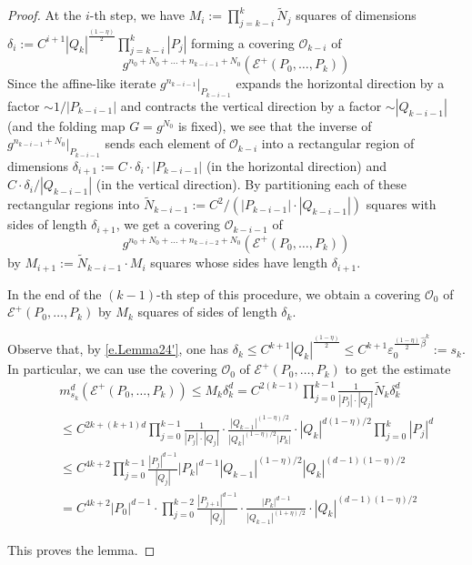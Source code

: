 \documentclass[12pt]{amsart}
\numberwithin{equation}{section}
\theoremstyle{definition}
\newcommand{\<}{{\langle}}
\renewcommand{\>}{{\rangle}}
\begin{document}
\begin{proof}
At the $i$-th step, we have $M_{i}:=\prod\limits_{j=k-i}^k \widetilde{N}_j$ squares of dimensions $\delta_i:=C^{i+1}|Q_k|^{\frac{(1-\eta)}{2}}\prod\limits_{j=k-i}^k |P_j|$ forming a covering 
$\mathcal{O}_{k-i}$ of 
$$g^{n_0+N_0+\dots+n_{k-i-1}+N_0}(\mathcal{E}^+(P_0,\dots,P_k))$$ 
Since the affine-like iterate $g^{n_{k-i-1}}|_{P_{k-i-1}}$ expands the horizontal direction by a factor $\sim 1/|P_{k-i-1}|$ and contracts the vertical direction by a factor $\sim |Q_{k-i-1}|$ (and the folding map $G=g^{N_0}$ is fixed), we see that the inverse of $g^{n_{k-i-1}+N_0}|_{P_{k-i-1}}$ sends each element of $\mathcal{O}_{k-i}$ into a rectangular region of dimensions $\delta_{i+1}:=C\cdot \delta_i\cdot |P_{k-i-1}|$ (in the horizontal direction) and $C\cdot \delta_i/|Q_{k-i-1}|$ (in the vertical direction). By partitioning each of these rectangular regions into $\widetilde{N}_{k-i-1}:=C^2/(|P_{k-i-1}|\cdot |Q_{k-i-1}|)$ squares with sides of length $\delta_{i+1}$, we get a covering $\mathcal{O}_{k-i-1}$ of 
$$g^{n_0+N_0+\dots+n_{k-i-2}+N_0}(\mathcal{E}^+(P_0,\dots,P_k))$$
by $M_{i+1}:=\widetilde{N}_{k-i-1}\cdot M_{i}$ squares whose sides have length $\delta_{i+1}$.

In the end of the $(k-1)$-th step of this procedure, we obtain a covering $\mathcal{O}_0$ of $\mathcal{E}^+(P_0,\dots,P_k)$ by $M_k$ squares of sides of length $\delta_k$. 

Observe that, by \eqref{e.Lemma24'}, one has $\delta_k\leq C^{k+1}|Q_k|^{\frac{(1-\eta)}{2}}\leq C^{k+1}\varepsilon_0^{\frac{(1-\eta)}{2}\widehat{\beta}^k}:=s_k$. In particular, we can use the covering $\mathcal{O}_0$ of $\mathcal{E}^+(P_0,\dots,P_k)$ to get the estimate
\begin{eqnarray*}
& &m_{s_k}^d(\mathcal{E}^+(P_0,\dots,P_k)) \leq M_k\delta_k^{d}=C^{2(k-1)}\prod\limits_{j=0}^{k-1}\frac{1}{|P_j|\cdot |Q_j|}\widetilde{N}_k\delta_k^d \\ 
& &\leq C^{2k+(k+1)d} \prod\limits_{j=0}^{k-1}\frac{1}{|P_j|\cdot |Q_j|}\cdot \frac{|Q_{k-1}|^{(1-\eta)/2}}{|Q_k|^{(1-\eta)/2} |P_k|}\cdot |Q_k|^{d(1-\eta)/2}\prod\limits_{j=0}^k |P_j|^d \\
& &\leq C^{4k+2} \prod\limits_{j=0}^{k-1}\frac{|P_j|^{d-1}}{|Q_j|} |P_k|^{d-1} |Q_{k-1}|^{(1-\eta)/2}|Q_k|^{(d-1)(1-\eta)/2} \\ 
& & = C^{4k+2} |P_0|^{d-1}\cdot\prod\limits_{j=0}^{k-2}\frac{|P_{j+1}|^{d-1}}{|Q_j|}\cdot\frac{|P_k|^{d-1}}{|Q_{k-1}|^{(1+\eta)/2}}\cdot |Q_k|^{(d-1)(1-\eta)/2}
\end{eqnarray*}

This proves the lemma.
\end{proof} 
\end{document}
